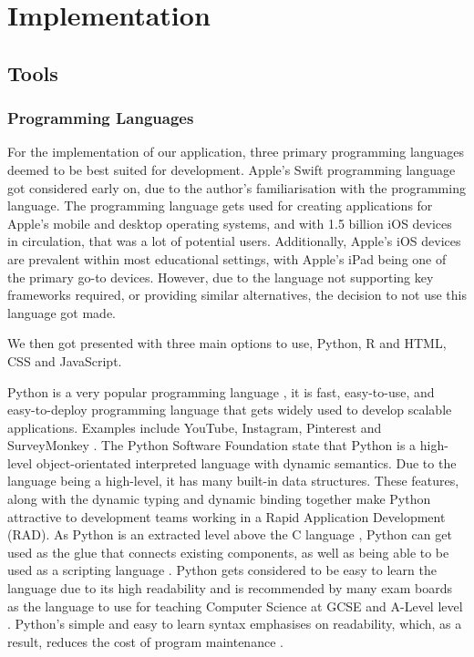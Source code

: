 \chapter{Implementation}
	\label{chap:implementation}
	
	\section{Tools}
	
	\subsection{Programming Languages}
	
	For the implementation of our application, three primary programming languages deemed to be best suited for development. Apple's Swift programming language \cite{swift} got considered early on, due to the author's familiarisation with the programming language. The programming language gets used for creating applications for Apple's mobile and desktop operating systems, and with 1.5 billion \cite{9to5mac} iOS devices in circulation, that was a lot of potential users. Additionally, Apple's iOS devices are prevalent within most educational settings, with Apple's iPad being one of the primary go-to devices. However, due to the language not supporting key frameworks required, or providing similar alternatives, the decision to not use this language got made. 
	
	We then got presented with three main options to use, Python, R and HTML, CSS and JavaScript.
	
	Python is a very popular programming language \cite{wired_python, sof_dev_servay20}, it is fast, easy-to-use, and easy-to-deploy programming language that gets widely used to develop scalable applications. Examples include YouTube, Instagram, Pinterest and SurveyMonkey \cite{hackr.io}. The Python Software Foundation state that Python is a high-level object-orientated interpreted language with dynamic semantics. Due to the language being a high-level, it has many built-in data structures. These features, along with the dynamic typing and dynamic binding together make Python attractive to development teams working in a Rapid Application Development (RAD). As Python is an extracted level above the C language \cite{sto_cpython}, Python can get used as the glue that connects existing components, as well as being able to be used as a scripting language \cite{python_desc}. Python gets considered to be easy to learn the language due to its high readability and is recommended by many exam boards as the language to use for teaching Computer Science at GCSE and A-Level level \cite{list exam boards here}. Python's simple and easy to learn syntax emphasises on readability, which, as a result, reduces the cost of program maintenance \cite{python_desc}. 
	
